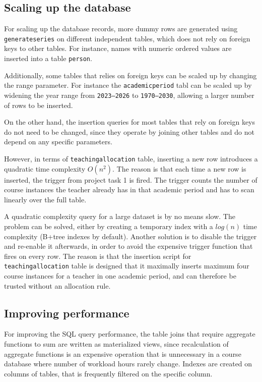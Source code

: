 \documentclass[a4paper]{scrartcl}
\renewcommand{\_}{\textunderscore\allowbreak}
\begin{document}
\subsection{Scaling up the database}

For scaling up the database records, more dummy rows are generated using \texttt{generate\_series} on different independent tables, which does not rely on foreign keys to other tables. For instance, names with numeric ordered values are inserted into a table \texttt{person}.

Additionally, some tables that relies on foreign keys can be scaled up by changing the range parameter. For instance the \texttt{academic\_period} tabl can be scaled up by widening the year range from \texttt{2023--2026} to \texttt{1970--2030}, allowing a larger number of rows to be inserted.

On the other hand, the insertion queries for most tables that rely on foreign keys do not need to be changed, since they operate by joining other tables and do not depend on any specific parameters.

However, in terms of \texttt{teaching\_allocation} table, inserting a new row introduces a quadratic time complexity $O(n^2)$. The reason is that each time a new row is inserted, the trigger from project task 1 is fired. The trigger counts the number of course instances the teacher already has in that academic period and has to scan linearly over the full table.

A quadratic complexity query for a large dataset is by no means slow. The problem can be solved, either by creating a temporary index with a $log(n)$ time complexity (B+tree indexes by default). Another solution is to disable the trigger and re-enable it afterwards, in order to avoid the expensive trigger function that fires on every row. The reason is that the insertion script for \texttt{teaching\_allocation} table is designed that it maximally inserts maximum four course instances for a teacher in one academic period, and can therefore be trusted without an allocation rule.

\subsection{Improving performance}
\label{sec:improving}

For improving the SQL query performance, the table joins that require aggregate functions to sum are written as materialized views, since recalculation of aggregate functions is an expensive operation that is unnecessary in a course database where number of workload hours rarely change. Indexes are created on columns of tables, that is frequently filtered on the specific column.
\end{document}
